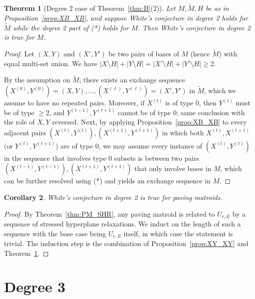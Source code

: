 \documentclass{amsart}
\newtheorem{theorem}{Theorem}[section]
\newtheorem{corollary}[theorem]{Corollary}
\begin{document}
\begin{theorem} [Degree 2 case of Theorem~\ref{thm:B}(2)]\label{thm:B2}
    Let $M,\widetilde{M},H$ be as in Proposition~\ref{prop:XB_XB}, and suppose White's conjecture in degree 2 holds for $\widetilde{M}$ while the degree 2 part of {\rm (*)} holds for $M$. Then White's conjecture in degree 2 is true for $M$.
\end{theorem}

\begin{proof}
    Let $(X,Y)$ and $(X',Y')$ be two pairs of bases of $M$ (hence $\widetilde{M}$) with equal multi-set union. We have $|X\setminus H|+|Y\setminus H|=|X'\setminus H|+|Y'\setminus H|\geq 2$.
    
    By the assumption on $\widetilde{M}$, there exists an exchange sequence $(X^{(0)},Y^{(0)})=(X,Y),\ldots,(X^{(\ell)}, Y^{(\ell)})=(X',Y')$ in $\widetilde{M}$, which we assume to have no repeated pairs. Moreover, if $X^{(t)}$ is of type 0, then $Y^{(t)}$ must be of type $\geq 2$, and $Y^{(t-1)},Y^{(t+1)}$ cannot be of type 0; same conclusion with the role of $X,Y$ reversed. Next, by applying Proposition~\ref{prop:XB_XB} to every adjacent pairs $(X^{(t)},Y^{(t)}),(X^{(t+1)},Y^{(t+1)})$ in which both $X^{(t)}, X^{(t+1)}$ (or $Y^{(t)}, Y^{(t+1)}$) are of type 0, we may assume every instance of $(X^{(t)},Y^{(t)})$ in the sequence that involves type 0 subsets is between two pairs $(X^{(t-1)},Y^{(t-1)}), (X^{(t+1)},Y^{(t+1)})$ that only involve bases in $M$, which can be further resolved using (*) and yields an exchange sequence in $M$.
\end{proof}

\begin{corollary}
    White's conjecture in degree 2 is true for paving matroids.
\end{corollary}

\begin{proof}
    By Theorem~\ref{thm:PM_SHR}, any paving matroid is related to $U_{r,E}$ by a sequence of stressed hyperplane relaxations. We induct on the length of such a sequence with the base case being $U_{r,E}$ itself, in which case the statement is trivial. The induction step is the combination of Proposition~\ref{prop:XY_XY} and Theorem~\ref{thm:B2}.
\end{proof}

\section{Degree 3}
\end{document}

